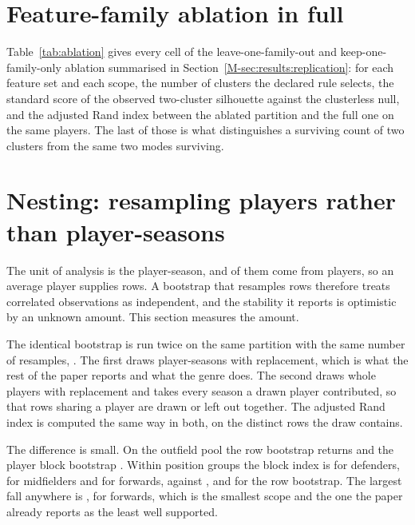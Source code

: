 \section{Feature-family ablation in full}
\label{sec:si:ablation}

Table~\ref{tab:ablation} gives every cell of the leave-one-family-out and keep-one-family-only
ablation summarised in Section~\ref{M-sec:results:replication}: for each feature set and each
scope, the number of clusters the declared rule selects, the standard score of the observed
two-cluster silhouette against the clusterless null, and the adjusted Rand index between the
ablated partition and the full one on the same players. The last of those is what distinguishes
a surviving count of two clusters from the same two modes surviving.



\section{Nesting: resampling players rather than player-seasons}
\label{sec:si:nesting}

The unit of analysis is the player-season, and \ArcEligible{} of them come from
\NestPlayersAll{} players, so an average player supplies \NestPerPlayerAll{} rows. A bootstrap
that resamples rows therefore treats correlated observations as independent, and the stability
it reports is optimistic by an unknown amount. This section measures the amount.

The identical bootstrap is run twice on the same partition with the same number of resamples,
\NestNBoot{}. The first draws player-seasons with replacement, which is what the rest of the
paper reports and what the genre does. The second draws whole players with replacement and takes
every season a drawn player contributed, so that rows sharing a player are drawn or left out
together. The adjusted Rand index is computed the same way in both, on the distinct rows the
draw contains.

The difference is small. On the outfield pool the row bootstrap returns \NestRowAll{} and the
player block bootstrap \NestBlockAll{}. Within position groups the block index is
\NestBlockDF{} for defenders, \NestBlockMF{} for midfielders and \NestBlockFW{} for forwards,
against \NestRowDF{}, \NestRowMF{} and \NestRowFW{} for the row bootstrap. The largest fall
anywhere is \NestLargestFall{}, for forwards, which is the smallest scope and the one the paper
already reports as the least well supported.

